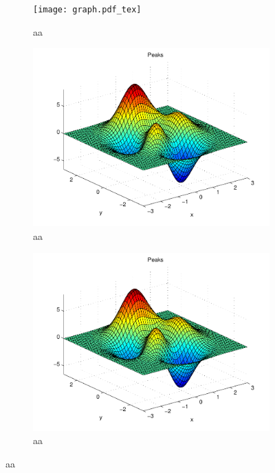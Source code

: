 \begin{figure}[h]
\small
\centering
\begin{subfigure}[b]{0.45\textwidth}
	\texttt{[image: graph.pdf\_tex]}
	\caption{aa} 
	\label{fig:aa1}
\end{subfigure}
\begin{subfigure}[b]{0.45\textwidth}
	\includegraphics[width=\textwidth]{mcmthesis-aaa-eps-converted-to.pdf}
	\caption{aa} 
	\label{fig:aa2}
\end{subfigure}
\begin{subfigure}[b]{0.45\textwidth}
	\includegraphics[width=\textwidth]{mcmthesis-aaa-eps-converted-to.pdf}
	\caption{aa} 
	\label{fig:aa3}
\end{subfigure}

\end{figure}

